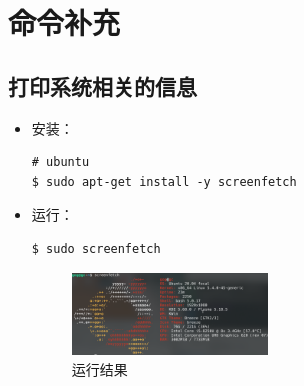 \chapter{命令补充}

\section{打印系统相关的信息}
\begin{itemize}
\item 安装：
\begin{lstlisting}
# ubuntu 
$ sudo apt-get install -y screenfetch 
\end{lstlisting}

\item 运行：
\begin{lstlisting}
$ sudo screenfetch
\end{lstlisting}


\begin{figure}[hbt!] 
    \centering
    \includegraphics[width=0.49\textwidth]{./img/screenfetch/ubuntu.png}
    \caption{运行结果} %
    \label{fig:ubuntu_screenfetch} %
\end{figure}
\end{itemize}
\newpage

